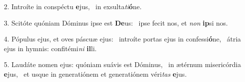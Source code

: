 2. Introíte in conspéctu \textbf{e}jus, \ast\  in exsulta\textit{ti}\textbf{ó}ne.\

3. Scitóte quóniam Dóminus ipse est \textbf{De}us: \ast\  ipse fecit nos, et \textit{non} \textbf{ip}si nos.\

4. Pópulus ejus, et oves páscuæ ejus: \dag\  introíte portas ejus in confessi\textbf{ó}ne, \ast\  átria ejus in hymnis: confitémi\textit{ni} \textbf{il}li.\

5. Laudáte nomen ejus: quóniam suávis est Dóminus, \dag\  in ætérnum misericórdia \textbf{e}jus, \ast\  et usque in generatiónem et generatiónem véri\textit{tas} \textbf{e}jus.\

